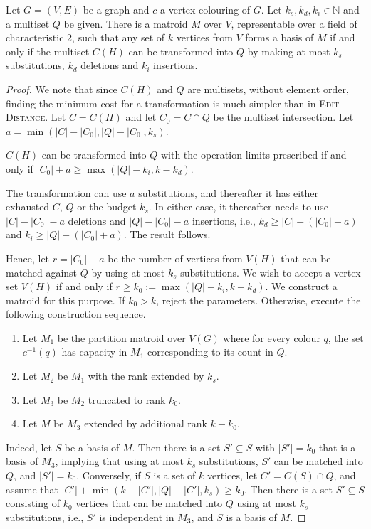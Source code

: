 \documentclass{theoretics}
\newcommand{\N}{\ensuremath{\mathbb N}\xspace}
\begin{document}
\begin{lemma}
  Let $G=(V,E)$ be a graph and $c$ a vertex colouring of $G$.
  Let $k_s, k_d, k_i \in \N$ and a multiset $Q$ be given.
  There is a matroid $M$ over $V$, representable over a field of characteristic 2,
  such that any set of $k$ vertices from $V$ forms a basis of $M$
  if and only if the multiset $C(H)$ can be transformed into $Q$
  by making at most $k_s$ substitutions, $k_d$ deletions and $k_i$
  insertions. 
\end{lemma}
\begin{proof}
  We note that since $C(H)$ and $Q$ are multisets, without element
  order, finding the minimum cost for a transformation is much simpler
  than in \textsc{Edit Distance}. Let $C=C(H)$ and let $C_0=C \cap Q$
  be the multiset intersection. Let $a=\min(|C|-|C_0|,|Q|-|C_0|,k_s)$.
  
  \begin{claim}
    $C(H)$ can be transformed into $Q$ with the operation limits
    prescribed if and only if $|C_0|+a \geq \max(|Q|-k_i,k-k_d)$.
  \end{claim}
  \begin{subproof}
    The transformation can use $a$ substitutions, and thereafter it
    has either exhausted $C$, $Q$ or the budget $k_s$. In either case, 
    it thereafter needs to use $|C|-|C_0|-a$ deletions and
    $|Q|-|C_0|-a$ insertions, i.e.,
    $k_d \geq |C|-(|C_0|+a)$ and $k_i \geq |Q|-(|C_0|+a)$. 
    The result follows.
  \end{subproof}

  Hence, let $r=|C_0|+a$ be the number of vertices from $V(H)$ that
  can be matched against $Q$ by using at most $k_s$ substitutions.
  We wish to accept a vertex set $V(H)$ if and only if
  $r \geq k_0 := \max(|Q|-k_i,k-k_d)$. We construct a matroid for this purpose.
  If $k_0>k$, reject the parameters. Otherwise, execute the following
  construction sequence.
  \begin{enumerate}
  \item Let $M_1$ be the partition matroid over $V(G)$ where for every
    colour $q$, the set $c^{-1}(q)$ has capacity in $M_1$ corresponding
    to its count in $Q$. 
  \item Let $M_2$ be $M_1$ with the rank extended by $k_s$.
  \item Let $M_3$ be $M_2$ truncated to rank $k_0$.
  \item Let $M$ be $M_3$ extended by additional rank $k-k_0$.    
  \end{enumerate}
  Indeed, let $S$ be a basis of $M$. Then there is a set $S' \subseteq S$
  with $|S'|=k_0$ that is a basis of $M_3$, implying that using at
  most $k_s$ substitutions, $S'$ can be matched into $Q$, and $|S'|=k_0$.
  Conversely, if $S$ is a set of $k$ vertices, let $C'=C(S) \cap Q$,
  and assume that $|C'|+\min(k-|C'|, |Q|-|C'|,k_s) \geq k_0$.
  Then there is a set $S' \subseteq S$ consisting of $k_0$
  vertices that can be matched into $Q$ using at most $k_s$
  substitutions, i.e., $S'$ is independent in $M_3$,
  and $S$ is a basis of $M$. 
\end{proof}
\end{document}
